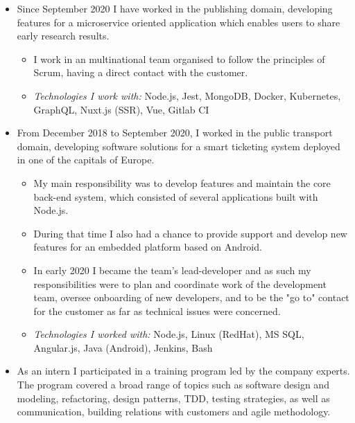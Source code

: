 \documentclass[10pt,a4paper,ragged2e]{altacv}
\begin{document}
\begin{itemize}
    \item Since September 2020 I have worked in the publishing domain, developing features for
    a microservice oriented application which enables users to share early research results.
    \begin{itemize}
        \item I work in an multinational team organised to follow the principles of Scrum,
        having a direct contact with the customer.
        \item \textit{Technologies I work with:} Node.js, Jest, MongoDB, Docker, Kubernetes, GraphQL, Nuxt.js (SSR),
        Vue, Gitlab CI
    \end{itemize}
 \divider
    \item From December 2018 to September 2020, I worked in the public transport domain,
    developing software solutions for a smart ticketing system deployed in one of the capitals of Europe.
    \begin{itemize}
        \item My main responsibility was to develop features and maintain the core back-end system,
        which consisted of several applications built with Node.js.
        \item During that time I also had a chance to provide support and develop new features
        for an embedded platform based on Android.
        \item In early 2020 I became the team’s lead-developer and as such my responsibilities
        were to plan and coordinate work of the development team, oversee onboarding of new
        developers, and to be the "go to" contact for the customer as far as technical
        issues were concerned.
        \item \textit{Technologies I worked with:} Node.js, Linux (RedHat), MS SQL, Angular.js,
        Java (Android), Jenkins, Bash
    \end{itemize}
\end{itemize}

\divider

\begin{itemize}
    \item As an intern I participated in a training program led by the company experts.
    The program covered a broad range of topics such as software design and modeling,
    refactoring, design patterns, TDD, testing strategies, as well as communication,
    building relations with customers and agile methodology.
\end{itemize}
\end{document}

